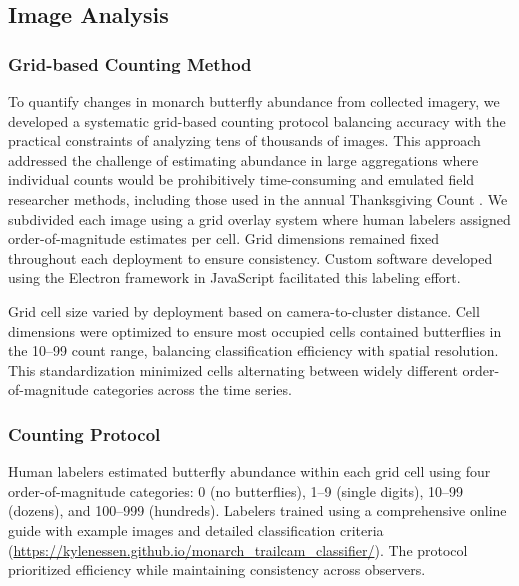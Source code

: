 
\subsection{Image Analysis}

\subsubsection{Grid-based Counting Method}

To quantify changes in monarch butterfly abundance from collected imagery, we developed a systematic grid-based counting protocol balancing accuracy with the practical constraints of analyzing tens of thousands of images. This approach addressed the challenge of estimating abundance in large aggregations where individual counts would be prohibitively time-consuming and emulated field researcher methods, including those used in the annual Thanksgiving Count \parencite{xercessocietyManagingMonarchsWest2018}. We subdivided each image using a grid overlay system where human labelers assigned order-of-magnitude estimates per cell. Grid dimensions remained fixed throughout each deployment to ensure consistency. Custom software developed using the Electron framework in JavaScript facilitated this labeling effort.

Grid cell size varied by deployment based on camera-to-cluster distance. Cell dimensions were optimized to ensure most occupied cells contained butterflies in the 10–99 count range, balancing classification efficiency with spatial resolution. This standardization minimized cells alternating between widely different order-of-magnitude categories across the time series.

\subsubsection{Counting Protocol}

Human labelers estimated butterfly abundance within each grid cell using four order-of-magnitude categories: 0 (no butterflies), 1–9 (single digits), 10–99 (dozens), and 100–999 (hundreds). Labelers trained using a comprehensive online guide with example images and detailed classification criteria (\url{https://kylenessen.github.io/monarch_trailcam_classifier/}). The protocol prioritized efficiency while maintaining consistency across observers.

